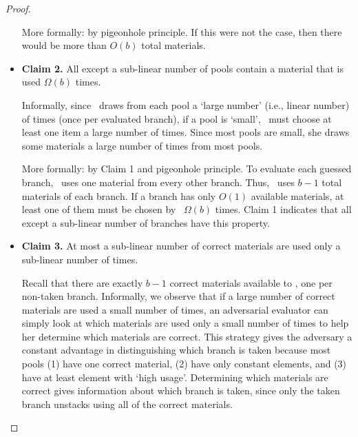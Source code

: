 \begin{proof}
\begin{itemize}
\begin{subproof}
      More formally: by pigeonhole principle.
      If this were not the case, then there
      would be more than $O(b)$ total materials.
    \end{subproof}

  \item \textbf{Claim 2.}
    All except a sub-linear number of pools contain a material that is
    used $\Omega(b)$ times.
    \begin{subproof}
      Informally, since \Eval\ draws from each pool a `large number'
      (i.e., linear number) of times (once per evaluated branch),
      if a pool is `small', \Eval\ must choose at least one item  a
      large number of times. Since most pools are small, she draws
      some materials a large number of times from most pools.

      More formally: by Claim 1 and pigeonhole principle. To evaluate
      each guessed branch, \Eval\ uses one material from every other
      branch.  Thus, \Eval\ uses $b-1$ total materials of each branch.
      If a branch has only $O(1)$ available materials, at least one of
      them must be chosen by \Eval\ $\Omega(b)$ times. Claim 1
      indicates that all except a sub-linear number of branches have
      this property.
    \end{subproof}

  \item \textbf{Claim 3.} At most a sub-linear number of
correct materials are used only a sub-linear number of times.
  \begin{subproof}
    Recall that there are exactly $b-1$ correct materials available to
    \Eval, one per non-taken branch.
    Informally, we observe that if a large number
    of correct materials are used a small number of times, an
    adversarial evaluator can simply look at which materials are used
    only a small number of times to help her determine which materials are
    correct.
    This strategy gives the adversary a constant advantage in
    distinguishing which branch is taken because most pools (1) have
    one correct material, (2) have only constant elements, and (3) have
    at least element with `high usage'.
    Determining which materials are correct gives information about
    which branch is taken, since only the taken branch unstacks using
    all of the correct materials.


\end{subproof}
\end{itemize}
\end{proof}
